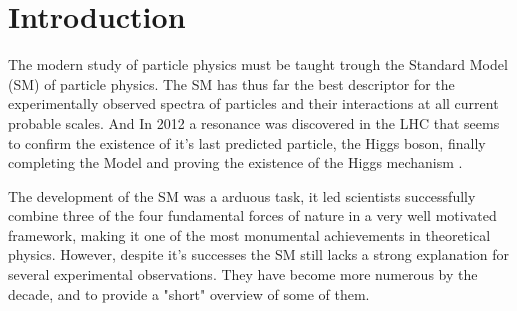 
\newpage

\chapter{Introduction}


The modern study of particle physics must be taught trough the Standard Model (SM) of particle physics. 
%
The SM has thus far the best descriptor for the experimentally observed spectra of particles and their interactions at all current probable scales. 
%
And In 2012 a resonance was discovered in the LHC that seems to confirm the existence of it's last predicted particle, the Higgs boson, finally completing the Model and proving the existence of the Higgs mechanism \cite{Aad_2012,chatrchyan2012observation,
collaborations2015combined,collaborations2016measurements}. 

The development of the SM was a arduous task, it led scientists successfully combine three of the four fundamental forces of nature in a very well motivated framework, making it one of the most monumental achievements in theoretical physics.
%
However, despite it's successes the SM still lacks a strong explanation for several experimental observations. They have become more numerous by the decade, and to provide a "short" overview of some of them. 

